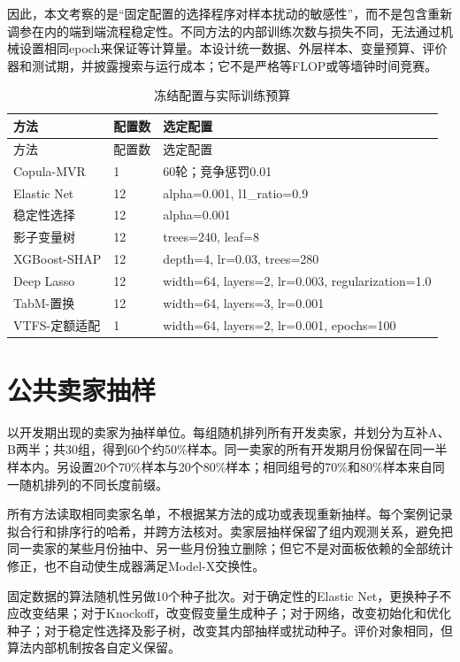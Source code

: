 \documentclass{sufethesismas}
\begin{document}
因此，本文考察的是``固定配置的选择程序对样本扰动的敏感性''，而不是包含重新调参在内的端到端流程稳定性。不同方法的内部训练次数与损失不同，无法通过机械设置相同epoch来保证等计算量。本设计统一数据、外层样本、变量预算、评价器和测试期，并披露搜索与运行成本；它不是严格等FLOP或等墙钟时间竞赛。

{
\footnotesize
\begin{longtable}[]{@{}lll@{}}
\caption{冻结配置与实际训练预算}\tabularnewline
\toprule\noalign{}
方法 & 配置数 & 选定配置 \\
\midrule\noalign{}
\endfirsthead
\toprule\noalign{}
方法 & 配置数 & 选定配置 \\
\midrule\noalign{}
\endhead
\bottomrule\noalign{}
\endlastfoot
Copula-MVR & 1 & 60轮；竞争惩罚0.01 \\
Elastic Net & 12 & alpha=0.001, l1\_ratio=0.9 \\
稳定性选择 & 12 & alpha=0.001 \\
影子变量树 & 12 & trees=240, leaf=8 \\
XGBoost-SHAP & 12 & depth=4, lr=0.03, trees=280 \\
Deep Lasso & 12 & width=64, layers=2, lr=0.003, regularization=1.0 \\
TabM-置换 & 12 & width=64, layers=3, lr=0.001 \\
VTFS-定额适配 & 1 & width=64, layers=2, lr=0.001, epochs=100 \\
\end{longtable}
}

\section{公共卖家抽样}

以开发期出现的卖家为抽样单位。每组随机排列所有开发卖家，并划分为互补A、B两半；共30组，得到60个约50\%样本。同一卖家的所有开发期月份保留在同一半样本内。另设置20个70\%样本与20个80\%样本；相同组号的70\%和80\%样本来自同一随机排列的不同长度前缀。

所有方法读取相同卖家名单，不根据某方法的成功或表现重新抽样。每个案例记录拟合行和排序行的哈希，并跨方法核对。卖家层抽样保留了组内观测关系，避免把同一卖家的某些月份抽中、另一些月份独立删除；但它不是对面板依赖的全部统计修正，也不自动使生成器满足Model-X交换性。

固定数据的算法随机性另做10个种子批次。对于确定性的Elastic Net，更换种子不应改变结果；对于Knockoff，改变假变量生成种子；对于网络，改变初始化和优化种子；对于稳定性选择及影子树，改变其内部抽样或扰动种子。评价对象相同，但算法内部机制按各自定义保留。
\end{document}
